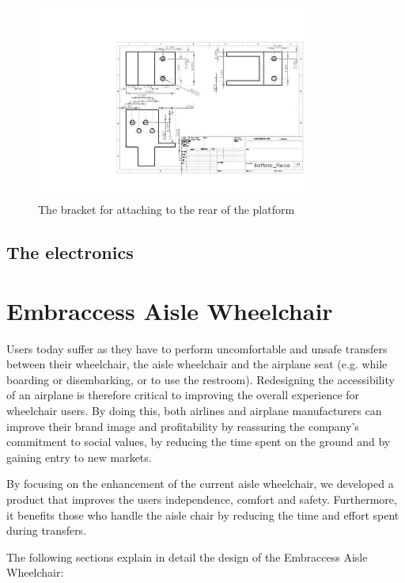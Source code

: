 \begin{figure}
\centering
 \includegraphics[width=0.8\textwidth]{images/Bottom_Piece}
\caption{The bracket for attaching to the rear of the platform}
\label{fig:bottom_piece}
\end{figure}

\subsection{The electronics}





\section{Embraccess Aisle Wheelchair}

Users today suffer as they have to perform uncomfortable and unsafe transfers between their wheelchair, the aisle wheelchair and the airplane seat (e.g. while boarding or disembarking, or to use the restroom). Redesigning the accessibility of an airplane is therefore critical to improving the overall experience for wheelchair users. By doing this, both airlines and airplane manufacturers can improve their brand image and profitability by reassuring the company's commitment to social values, by reducing the time spent on the ground and by gaining entry to new markets.

By focusing on the enhancement of the current aisle wheelchair, we developed a product that improves the users independence, comfort and safety. Furthermore, it benefits those who handle the aisle chair by reducing the time and effort spent during transfers.

The following sections explain in detail the design of the Embraccess Aisle Wheelchair:

